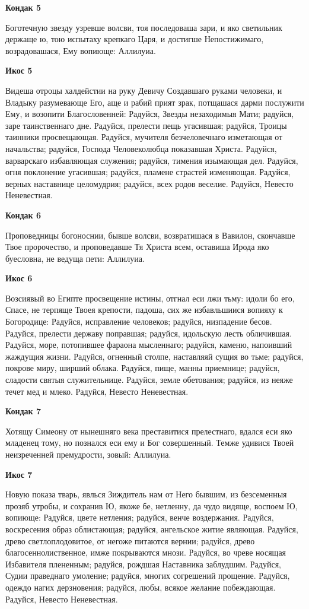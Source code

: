 \bfseries Кондак 5\normalfont{}


Боготечную звезду узревше волсви, тоя последоваша зари, и яко светильник держаще ю, тою испытаху крепкаго Царя, и достигше Непостижимаго, возрадовашася, Ему вопиюще: Аллилуиа.


\bfseries Икос 5\normalfont{}


Видеша отроцы халдейстии на руку Девичу Создавшаго руками человеки, и Владыку разумевающе Его, аще и рабий прият зрак, потщашася дарми послужити Ему, и возопити Благословенней: Радуйся, Звезды незаходимыя Мати; радуйся, заре таинственнаго дне. Радуйся, прелести пещь угасившая; радуйся, Троицы таинники просвещающая. Радуйся, мучителя безчеловечнаго изметающая от начальства; радуйся, Господа Человеколюбца показавшая Христа. Радуйся, варварскаго избавляющая служения; радуйся, тимения изымающая дел. Радуйся, огня поклонение угасившая; радуйся, пламене страстей изменяющая. Радуйся, верных наставнице целомудрия; радуйся, всех родов веселие. Радуйся, Невесто Неневестная.


\bfseries Кондак 6\normalfont{}


Проповедницы богоноснии, бывше волсви, возвратишася в Вавилон, скончавше Твое пророчество, и проповедавше Тя Христа всем, оставиша Ирода яко буесловна, не ведуща пети: Аллилуиа.


\bfseries Икос 6\normalfont{}


Возсиявый во Египте просвещение истины, отгнал еси лжи тьму: идоли бо его, Спасе, не терпяще Твоея крепости, падоша, сих же избавльшиися вопияху к Богородице: Радуйся, исправление человеков; радуйся, низпадение бесов. Радуйся, прелести державу поправшая; радуйся, идольскую лесть обличившая. Радуйся, море, потопившее фараона мысленнаго; радуйся, каменю, напоивший жаждущия жизни. Радуйся, огненный столпе, наставляяй сущия во тьме; радуйся, покрове миру, ширший облака. Радуйся, пище, манны приемнице; радуйся, сладости святыя служительнице. Радуйся, земле обетования; радуйся, из неяже течет мед и млеко. Радуйся, Невесто Неневестная.


\bfseries Кондак 7\normalfont{}


Хотящу Симеону от нынешняго века преставитися прелестнаго, вдался еси яко младенец тому, но познался еси ему и Бог совершенный. Темже удивися Твоей неизреченней премудрости, зовый: Аллилуиа.


\bfseries Икос 7\normalfont{}


Новую показа тварь, явлься Зиждитель нам от Него бывшим, из безсеменныя прозяб утробы, и сохранив Ю, якоже бе, нетленну, да чудо видяще, воспоем Ю, вопиюще: Радуйся, цвете нетления; радуйся, венче воздержания. Радуйся, воскресения образ облистающая; радуйся, ангельское житие являющая. Радуйся, древо светлоплодовитое, от негоже питаются вернии; радуйся, древо благосеннолиственное, имже покрываются мнози. Радуйся, во чреве носящая Избавителя плененным; радуйся, рождшая Наставника заблудшим. Радуйся, Судии праведнаго умоление; радуйся, многих согрешений прощение. Радуйся, одеждо нагих дерзновения; радуйся, любы, всякое желание побеждающая. Радуйся, Невесто Неневестная.


